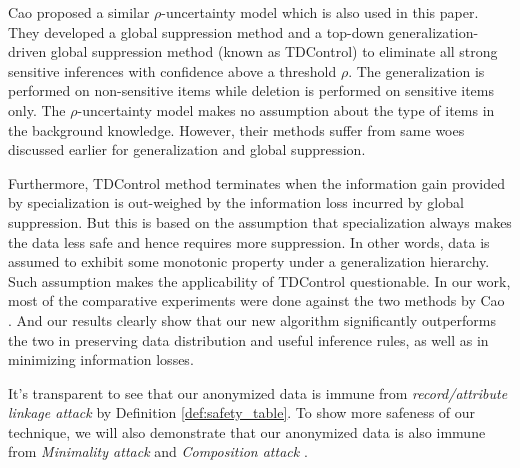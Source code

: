 Cao \etal \cite{Cao:2010:rho} proposed a similar $\rho$-uncertainty model
which is also used in this paper.
They developed a global suppression method and a top-down
generalization-driven global suppression method (known as TDControl)
to eliminate all strong sensitive inferences with confidence above
a threshold $\rho$.
The generalization is performed on non-sensitive items
while deletion is performed on sensitive items only. The $\rho$-uncertainty
model makes no assumption about the type of items in
the background knowledge. However, their
methods suffer from same woes discussed earlier for generalization and
global suppression.

Furthermore, TDControl method terminates when the information gain provided
by specialization is out-weighed by the information loss incurred by global
suppression. But this is based on the assumption that specialization always
makes the data less safe and hence requires more suppression. In other words,
data is assumed to exhibit some monotonic property under a generalization
hierarchy. Such assumption makes the applicability of TDControl questionable.
In our work, most of the comparative experiments were done against the two
methods by Cao \etal. And our results clearly show that our new algorithm
significantly outperforms the two in preserving data distribution and useful
inference rules, as well as in minimizing information losses.

It's transparent to see that our anonymized data is immune from {\em
record/attribute linkage attack} \cite{FungWCY10:Survey} by Definition
\ref{def:safety_table}. To show more safeness of our technique, we will also
demonstrate that our anonymized data is also immune from {\em Minimality
attack} \cite{Wong:2007:Minimality} and {\em Composition attack}
\cite{Ganta:2008:Composition}. 

